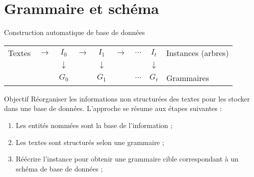 \section{Grammaire et schéma}

\begin{frame}{Construction automatique de base de données}
    \centering
    \begin{adjustbox}{max width=.8\linewidth}
        \begin{tabular}{cccccccc|l}
            Textes & $\rightarrow$ & $I_0$         & $\rightarrow$ & $ I_1$        & $\rightarrow$ & $ \dots$ & $I_t$         & Instances (arbres) \\
                   &               & $\downarrow$  &               & $\downarrow$  &               &          & $\downarrow$  &                    \\
                   &               & $G_0$         &               & $G_1$         &               & $ \dots$ & $G_t$         & Grammaires         \\
        \end{tabular}
    \end{adjustbox}

    \vfill

    \begin{block}{Objectif}
        Réorganiser les informations non structurées des textes pour les stocker dans une base de données.
        L'approche se résume aux étapes suivantes :
        \begin{enumerate}
            \item Les entités nommées sont la base de l'information ;
            \item Les textes sont structurés selon une grammaire ;
            \item Réécrire l'instance pour obtenir une grammaire cible correspondant à un schéma de base de données ;
        \end{enumerate}
    \end{block}
\end{frame}

